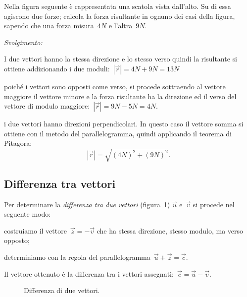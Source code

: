 \begin{esempio}
Nella figura seguente è rappresentata una scatola vista dall'alto. Su di essa 
agiscono due forze; calcola la forza risultante in ognuno dei casi della 
figura,
sapendo che una forza misura~$4 \unit{N}$ e l'altra~$9 \unit{N}$.
\begin{center}
 
\end{center}
\emph{Svolgimento:}
\begin{enumeratea}
\item I due vettori hanno la stessa direzione e lo stesso verso quindi la 
risultante si ottiene addizionando i due moduli:~$|\vec{r}|=4 \unit{N}+9 
\unit{N}=13 \unit{N}$
\item poiché i vettori sono opposti come verso, si procede sottraendo al 
vettore maggiore il vettore minore e la forza risultante ha la direzione ed 
il 
verso
del vettore di modulo maggiore:~$|\vec{r}|=9 \unit{N} - 5 \unit{N}=4 
\unit{N}$.
\item i due vettori hanno direzioni perpendicolari. In questo caso il vettore 
somma si ottiene con il metodo del parallelogramma, quindi applicando il 
teorema di Pitagora:
\[|\vec{r}|=\sqrt{(4 \unit{N})^2+(9 \unit{N})^2}.\]
\end{enumeratea}
\end{esempio}

\subsection{Differenza tra vettori}

\begin{procedura} Per determinare la \emph{differenza tra due vettori} 
(figura~\ref{fig:F.11}) $\vec{u}$ e~$\vec{v}$
si procede nel seguente modo:
\begin{enumeratea}
\item costruiamo il vettore~$\vec{z}=-\vec{v}$ che ha stessa direzione, 
stesso 
modulo, ma verso opposto;
\item determiniamo con la regola del 
parallelogramma~$\vec{u}+\vec{z}=\vec{c}$.
\end{enumeratea}
Il vettore ottenuto è la differenza tra i vettori 
assegnati:~$\vec{c}=\vec{u}-\vec{v}$.
\end{procedura}

\begin{inaccessibleblock}
 \begin{figure}[t]
 \centering
 
 \caption{Differenza di due vettori.}
 \label{fig:F.11}
\end{figure}
\end{inaccessibleblock}

